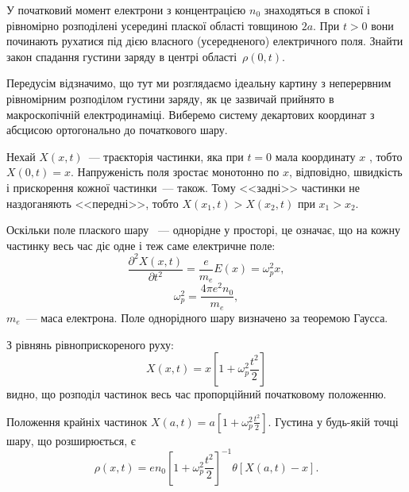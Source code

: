 \begin{problem}
У початковий момент електрони з концентрацією $n_0$   знаходяться в спокої і рівномірно розподілені усередині пласкої області товщиною $2a$. При $t>0$  вони починають рухатися під дією власного (усередненого) електричного поля. Знайти закон спадання густини заряду в центрі області~$\rho(0,t)$.
\begin{solution}
	Передусім відзначимо, що тут ми розглядаємо ідеальну картину з неперервним рівномірним розподілом густини заряду, як це зазвичай прийнято в макроскопічній електродинаміці. Виберемо систему декартових координат з абсцисою ортогонально до початкового шару.

	Нехай $X(x,t)$~--- траєкторія частинки, яка при $t = 0$   мала координату $x$ , тобто $X(0,t) = x$. Напруженість поля зростає монотонно по $x$, відповідно, швидкість і прискорення кожної частинки~--- також. Тому <<задні>> частинки не наздоганяють <<передні>>, тобто  $X(x_1,t) > X(x_2,t)$  при ${x_1} > {x_2}$.

		Оскільки поле плаского шару ~--- однорідне у просторі, це означає, що на кожну частинку весь час діє одне і теж саме електричне поле:
		\[
			\frac{{{\partial ^2}X(x,t)}}{{\partial {t^2}}} = \frac{e}{m_e}E(x) = \omega _p^2x,
		\]
		\[
			\omega _p^2 = \frac{{4\pi {e^2}{n_0}}}{m_e},
		\]
	$m_e$~--- маса електрона. Поле однорідного шару визначено за теоремою Гаусса.

		З рівнянь рівноприскореного руху:
		\[
			X(x,t) = x\left[ {1 + \omega _p^2\frac{{{t^2}}}{2}} \right]
		\]
		видно, що розподіл частинок весь час пропорційний початковому положенню.

		Положення крайніх частинок $X(a,t) = a\left[ {1 + \omega _p^2\frac{{{t^2}}}{2}} \right]$.
	Густина у будь-якій точці шару, що розширюється, є
	\[
		\rho (x,t) = e{n_0}{\left[ {1 + \omega _p^2\frac{{{t^2}}}{2}} \right]^{ - 1}}\theta \left[ {X(a,t) - x} \right].
	\]
\end{solution}
\end{problem}


